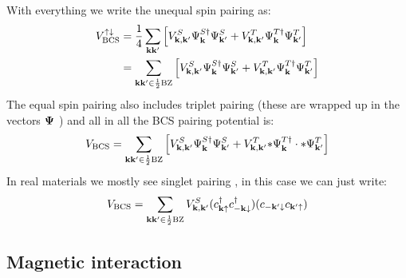 With everything we write the unequal spin pairing as:
\begin{align}
    V_{\text{BCS}}^{\uparrow \downarrow} &= \frac{1}{4} \sum_{\mathbf{k} \mathbf{k}^{\prime}} \left[ V_{\mathbf{k}, \mathbf{k}^{\prime}}^S \Psi_{\mathbf{k}}^{S \dagger} \Psi_{\mathbf{k}^{\prime}}^{S} + V_{\mathbf{k}, \mathbf{k}^{\prime}}^T \Psi_{\mathbf{k}}^{T \dagger} \Psi_{\mathbf{k}^{\prime}}^{T} \right] \\
    &= \sum_{\mathbf{k} \mathbf{k}^{\prime} \in \frac{1}{2} \text{BZ}} \left[ V_{\mathbf{k}, \mathbf{k}^{\prime}}^S \Psi_{\mathbf{k}}^{S \dagger} \Psi_{\mathbf{k}^{\prime}}^{S} + V_{\mathbf{k}, \mathbf{k}^{\prime}}^T \Psi_{\mathbf{k}}^{T \dagger} \Psi_{\mathbf{k}^{\prime}}^{T} \right]
\end{align}
The equal spin pairing also includes triplet pairing (these are wrapped up in the vectors \(\mathbf{\Psi}\) ) and all in all the BCS pairing potential is:
\begin{align}
    V_{\text{BCS}} = \sum_{\mathbf{k} \mathbf{k}^{\prime} \in \frac{1}{2} \text{BZ}} \left[ V_{\mathbf{k}, \mathbf{k}^{\prime}}^S \Psi_{\mathbf{k}}^{S \dagger} \Psi_{\mathbf{k}^{\prime}}^{S} + V_{\mathbf{k}, \mathbf{k}^{\prime}}^T \mathbf{*}{\Psi}_{\mathbf{k}}^{T \dagger} \cdot \mathbf{*}{\Psi}_{\mathbf{k}^{\prime}}^{T} \right]
\end{align}
In real materials we mostly see singlet pairing  , in this case we can just write:
\begin{equation}
    V_{\text{BCS}} = \sum_{\mathbf{k} \mathbf{k}^{\prime} \in \frac{1}{2} \text{BZ}} V_{\mathbf{k}, \mathbf{k}^{\prime}}^S
    (c_{\mathbf{k} \uparrow}^{\dagger}
    c_{-\mathbf{k} \downarrow}^{\dagger})
    (c_{-\mathbf{k}^{\prime} \downarrow}
    c_{\mathbf{k}^{\prime} \uparrow})
\end{equation}


\subsection{Magnetic interaction}


